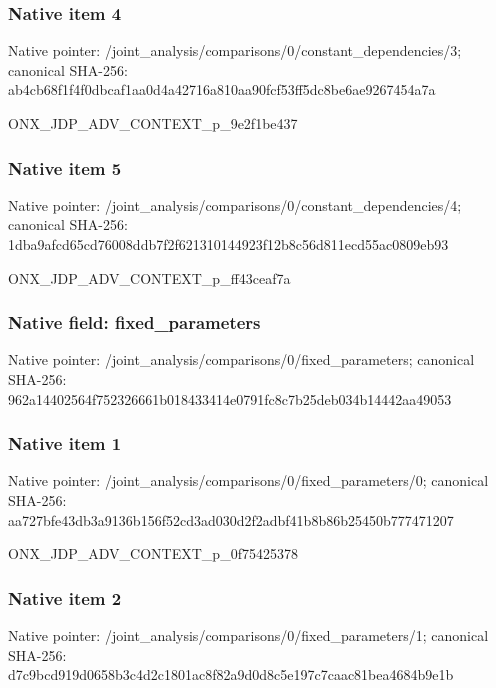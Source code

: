\documentclass[10pt,a4paper]{article}
\begin{document}
\subsubsection{Native item 4}
Native pointer: /joint\_\allowbreak{}analysis/comparisons/0/constant\_\allowbreak{}dependencies/3; canonical SHA-256: ab4cb68f1f4f0dbcaf1aa0d4a42716a810aa90fcf53ff5dc8be6ae9267454a7a

\begingroup\raggedright\sloppy ONX\_\allowbreak{}JDP\_\allowbreak{}ADV\_\allowbreak{}CONTEXT\_\allowbreak{}p\_\allowbreak{}9e2f1be437\par\endgroup

\subsubsection{Native item 5}
Native pointer: /joint\_\allowbreak{}analysis/comparisons/0/constant\_\allowbreak{}dependencies/4; canonical SHA-256: 1dba9afcd65cd76008ddb7f2f621310144923f12b8c56d811ecd55ac0809eb93

\begingroup\raggedright\sloppy ONX\_\allowbreak{}JDP\_\allowbreak{}ADV\_\allowbreak{}CONTEXT\_\allowbreak{}p\_\allowbreak{}ff43ceaf7a\par\endgroup

\subsubsection{Native field: fixed\_\allowbreak{}parameters}
Native pointer: /joint\_\allowbreak{}analysis/comparisons/0/fixed\_\allowbreak{}parameters; canonical SHA-256: 962a14402564f752326661b018433414e0791fc8c7b25deb034b14442aa49053

\subsubsection{Native item 1}
Native pointer: /joint\_\allowbreak{}analysis/comparisons/0/fixed\_\allowbreak{}parameters/0; canonical SHA-256: aa727bfe43db3a9136b156f52cd3ad030d2f2adbf41b8b86b25450b777471207

\begingroup\raggedright\sloppy ONX\_\allowbreak{}JDP\_\allowbreak{}ADV\_\allowbreak{}CONTEXT\_\allowbreak{}p\_\allowbreak{}0f75425378\par\endgroup

\subsubsection{Native item 2}
Native pointer: /joint\_\allowbreak{}analysis/comparisons/0/fixed\_\allowbreak{}parameters/1; canonical SHA-256: d7c9bcd919d0658b3c4d2c1801ac8f82a9d0d8c5e197c7caac81bea4684b9e1b
\end{document}
